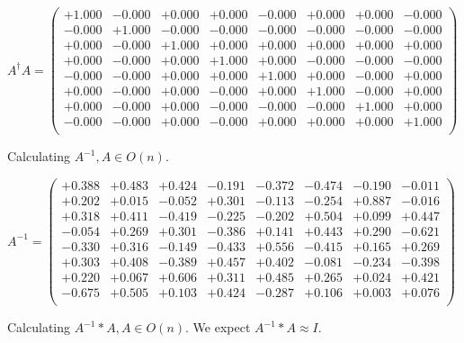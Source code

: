 \documentclass[9pt]{article}
\theoremstyle{plain}
\theoremstyle{definition}
\theoremstyle{remark}
\numberwithin{equation}{section}
\begin{document}
$A^{\dag} A = \left(
\begin{array}{
cccccccc}
+1.000 & -0.000 & +0.000 & +0.000 & -0.000 & +0.000 & +0.000 & -0.000 \\
-0.000 & +1.000 & -0.000 & -0.000 & -0.000 & -0.000 & -0.000 & -0.000 \\
+0.000 & -0.000 & +1.000 & +0.000 & +0.000 & +0.000 & +0.000 & +0.000 \\
+0.000 & -0.000 & +0.000 & +1.000 & +0.000 & -0.000 & -0.000 & -0.000 \\
-0.000 & -0.000 & +0.000 & +0.000 & +1.000 & +0.000 & -0.000 & +0.000 \\
+0.000 & -0.000 & +0.000 & -0.000 & +0.000 & +1.000 & -0.000 & +0.000 \\
+0.000 & -0.000 & +0.000 & -0.000 & -0.000 & -0.000 & +1.000 & +0.000 \\
-0.000 & -0.000 & +0.000 & -0.000 & +0.000 & +0.000 & +0.000 & +1.000 \\
\end{array}
\right)$ \newline 

Calculating $A^{-1} ,  A \in O(n)$.

$A^{-1} = \left(
\begin{array}{
cccccccc}
+0.388 & +0.483 & +0.424 & -0.191 & -0.372 & -0.474 & -0.190 & -0.011 \\
+0.202 & +0.015 & -0.052 & +0.301 & -0.113 & -0.254 & +0.887 & -0.016 \\
+0.318 & +0.411 & -0.419 & -0.225 & -0.202 & +0.504 & +0.099 & +0.447 \\
-0.054 & +0.269 & +0.301 & -0.386 & +0.141 & +0.443 & +0.290 & -0.621 \\
-0.330 & +0.316 & -0.149 & -0.433 & +0.556 & -0.415 & +0.165 & +0.269 \\
+0.303 & +0.408 & -0.389 & +0.457 & +0.402 & -0.081 & -0.234 & -0.398 \\
+0.220 & +0.067 & +0.606 & +0.311 & +0.485 & +0.265 & +0.024 & +0.421 \\
-0.675 & +0.505 & +0.103 & +0.424 & -0.287 & +0.106 & +0.003 & +0.076 \\
\end{array}
\right)$ \newline 

Calculating $A^{-1} *A  ,  A \in O(n)$.   We expect $A^{-1} *A  \approx I$. 
\end{document}
